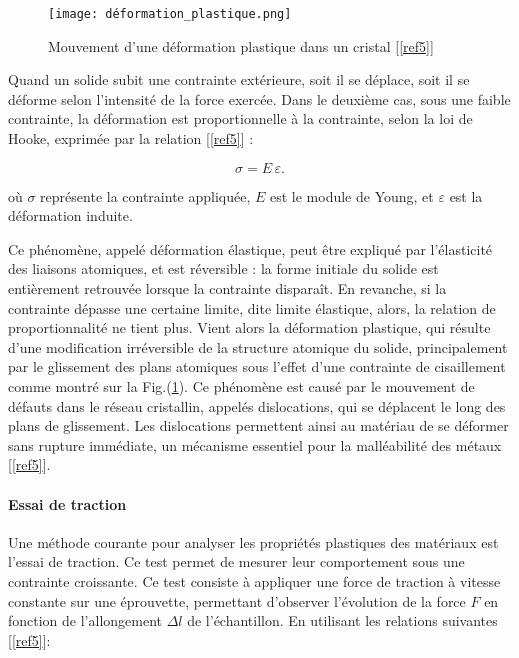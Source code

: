 \documentclass[a4paper, 12pt,oneside]{article}
\begin{document}
\begin{figure}
    \vspace{-0.8cm}
    \centering
    \texttt{[image: déformation\_plastique.png]}
    \captionsetup{justification=centering}
    \caption{Mouvement d'une déformation plastique dans un cristal [\ref{ref5}]}
    \label{fig1}
    \vspace{2cm}
\end{figure}

Quand un solide subit une contrainte extérieure, soit il se déplace, soit il se déforme selon l’intensité de la force exercée. Dans le deuxième cas, sous une faible contrainte, la déformation est proportionnelle à la contrainte, selon la loi de Hooke, exprimée par la relation [\ref{ref5}] :

\vspace{-0.5cm}
\begin{equation}
    \sigma=E\,\varepsilon.
\label{eq1}
\end{equation}
\vspace{-0.4cm}

\noindent où $\sigma$ représente la contrainte appliquée, $E$ est le module de Young, et $\varepsilon$ est la déformation induite. 

Ce phénomène, appelé déformation élastique, peut être expliqué par l'élasticité des liaisons atomiques, et est réversible : la forme initiale du solide est entièrement retrouvée lorsque la contrainte disparaît. En revanche, si la contrainte dépasse une certaine limite, dite limite élastique, alors, la relation de proportionnalité ne tient plus. Vient alors la déformation plastique, qui résulte d’une modification irréversible de la structure atomique du solide, principalement par le glissement des plans atomiques sous l’effet d’une contrainte de cisaillement comme montré sur la Fig.(\ref{fig1}). Ce phénomène est causé par le mouvement de défauts dans le réseau cristallin, appelés dislocations, qui se déplacent le long des plans de glissement. Les dislocations permettent ainsi au matériau de se déformer sans rupture immédiate, un mécanisme essentiel pour la malléabilité des métaux [\ref{ref5}].

\vspace{-0.2cm}
\paragraph{Essai de traction}

Une méthode courante pour analyser les propriétés plastiques des matériaux est l’essai de traction. Ce test permet de mesurer leur comportement sous une contrainte croissante. Ce test consiste à appliquer une force de traction à vitesse constante sur une éprouvette, permettant d’observer l’évolution de la force $F$ en fonction de l’allongement $\Delta l$ de l’échantillon. En utilisant les relations suivantes [\ref{ref5}]:
\end{document}
